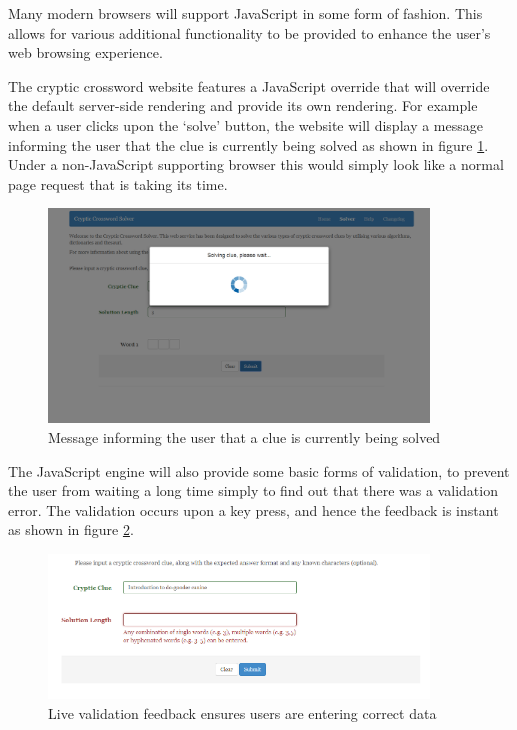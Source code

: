 Many modern browsers will support JavaScript in some form of fashion. This 
allows for various additional functionality to be provided to enhance the user's
web browsing experience.

The cryptic crossword website features a JavaScript override that will override
the default server-side rendering and provide its own rendering. For example
when a user clicks upon the `solve' button, the website will display a message
informing the user that the clue is currently being solved as shown in figure 
\ref{fig:solving_clue_message}. Under a non-JavaScript supporting browser this 
would simply look like a normal page request that is taking its time.

\begin{figure}[H]
  \centering
  \includegraphics[width=0.9\textwidth]{images/solving_clue.png}
  \caption{Message informing the user that a clue is currently being solved}
  \label{fig:solving_clue_message}
\end{figure}

The JavaScript engine will also provide some basic forms of validation, to 
prevent the user from waiting a long time simply to find out that there was a 
validation error. The validation occurs upon a key press, and hence the feedback
is instant as shown in figure \ref{fig:validation_message}.

\begin{figure}[H]
  \centering
  \includegraphics[width=0.9\textwidth]{images/validation.png}
  \caption{Live validation feedback ensures users are entering correct data}
  \label{fig:validation_message}
\end{figure}

